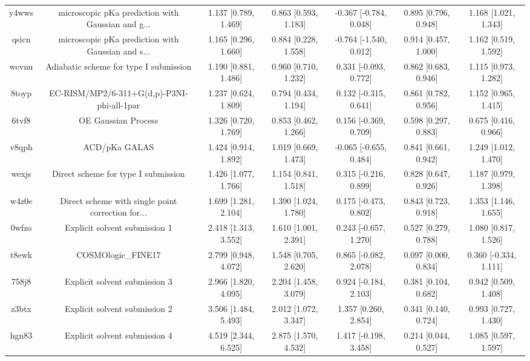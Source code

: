 \documentclass{article}
\begin{document}
\begin{center}
\begin{longtable}{|ccccccc|}
 y4wws &  microscopic pKa prediction with Gaussian and g... &  1.137 [0.789, 1.469] &  0.863 [0.593, 1.183] &   -0.367 [-0.784, 0.048] &  0.895 [0.796, 0.948] &   1.168 [1.021, 1.343] \\
 qsicn &  microscopic pKa prediction with Gaussian and s... &  1.165 [0.296, 1.660] &  0.884 [0.228, 1.558] &   -0.764 [-1.540, 0.012] &  0.914 [0.457, 1.000] &   1.162 [0.519, 1.592] \\
 wcvnu &             Adiabatic scheme for type I submission &  1.190 [0.881, 1.486] &  0.960 [0.710, 1.232] &    0.331 [-0.093, 0.772] &  0.862 [0.683, 0.946] &   1.115 [0.973, 1.282] \\
 8toyp &         EC-RISM/MP2/6-311+G(d,p)-P3NI-phi-all-1par &  1.237 [0.624, 1.809] &  0.794 [0.434, 1.194] &    0.132 [-0.315, 0.641] &  0.861 [0.782, 0.956] &   1.152 [0.965, 1.415] \\
 6tvf8 &                                OE Gaussian Process &  1.326 [0.720, 1.769] &  0.853 [0.462, 1.266] &    0.156 [-0.369, 0.709] &  0.598 [0.297, 0.883] &   0.675 [0.416, 0.966] \\
 v8qph &                                      ACD/pKa GALAS &  1.424 [0.914, 1.892] &  1.019 [0.669, 1.473] &   -0.065 [-0.655, 0.484] &  0.841 [0.661, 0.942] &   1.249 [1.012, 1.470] \\
 wexjs &                Direct scheme for type I submission &  1.426 [1.077, 1.766] &  1.154 [0.841, 1.518] &    0.315 [-0.216, 0.899] &  0.828 [0.647, 0.926] &   1.187 [0.979, 1.398] \\
 w4z0e &  Direct scheme with single point correction for... &  1.699 [1.281, 2.104] &  1.390 [1.024, 1.780] &    0.175 [-0.473, 0.802] &  0.843 [0.723, 0.918] &   1.353 [1.146, 1.655] \\
 0wfzo &                      Explicit solvent submission 1 &  2.418 [1.313, 3.552] &  1.610 [1.001, 2.391] &    0.243 [-0.657, 1.270] &  0.527 [0.279, 0.788] &   1.080 [0.817, 1.526] \\
 t8ewk &                                 COSMOlogic\_FINE17 &  2.799 [0.948, 4.072] &  1.548 [0.705, 2.620] &    0.865 [-0.082, 2.078] &  0.097 [0.000, 0.834] &  0.360 [-0.334, 1.111] \\
 758j8 &                      Explicit solvent submission 3 &  2.966 [1.820, 4.095] &  2.204 [1.458, 3.079] &    0.924 [-0.184, 2.103] &  0.381 [0.104, 0.682] &   0.942 [0.509, 1.408] \\
 z3btx &                      Explicit solvent submission 2 &  3.506 [1.484, 5.493] &  2.012 [1.072, 3.347] &     1.357 [0.260, 2.854] &  0.341 [0.140, 0.724] &   0.993 [0.727, 1.430] \\
 hgn83 &                      Explicit solvent submission 4 &  4.519 [2.344, 6.525] &  2.875 [1.570, 4.532] &    1.417 [-0.198, 3.458] &  0.214 [0.044, 0.527] &   1.085 [0.597, 1.597] \\
\end{longtable}
\end{center}
\end{document}
